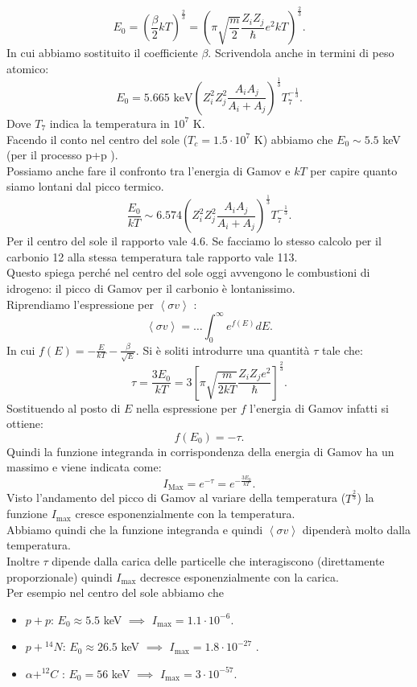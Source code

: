 \[
    E_0 = \left(\frac{\beta}{2}kT\right)^{\frac{2}{3}}=
    \left(\pi\sqrt{\frac{m}{2}} \frac{Z_iZ_j}{\hbar }e^2kT\right)^{\frac{2}{3}}
.\] 
In cui abbiamo sostituito il coefficiente $\beta$. Scrivendola anche in termini di peso atomico:
\[
    E_0=5.665 \text{ keV}\left(Z_i^2Z_j^2 \frac{A_iA_j}{A_i+A_j} \right)^{\frac{1}{3}}T_7^{-\frac{1}{3}}
.\] 
Dove $T_7$ indica la temperatura in $10^7$ K. \\
Facendo il conto nel centro del sole ($T_c = 1.5 \cdot 10^{7}$ K) abbiamo che $E_0 \sim 5.5 $ keV (per il processo p+p ).\\
Possiamo anche fare il confronto tra l'energia di Gamov e $kT$ per capire quanto siamo lontani dal picco termico.
\[
    \frac{E_0}{kT} \sim 6.574 \left(Z_i^2Z_j^2 \frac{A_iA_j }{A_i+A_j}\right)^{\frac{1}{3}}T_7^{-\frac{1}{3}}
.\] 
Per il centro del sole il rapporto vale $4.6$. Se facciamo lo stesso calcolo per il carbonio 12 alla stessa temperatura tale rapporto vale 113. \\
Questo spiega perché nel centro del sole oggi avvengono le combustioni di idrogeno: il picco di Gamov per il carbonio è lontanissimo. \\
Riprendiamo l'espressione per $\left<\sigma v\right>$  :
\[
    \left<\sigma v\right> = \ldots \int_{0}^{\infty} e^{f(E)}dE 
.\] 
In cui $f(E) = -\frac{E}{kT}-\frac{\beta}{\sqrt{E}}$. Si è soliti introdurre una quantità $\tau$  tale che:
\[
\tau = \frac{3E_0}{kT}= 3\left[\pi\sqrt{\frac{m}{2kT}} \frac{Z_iZ_je^2}{\hbar }\right]^{\frac{2}{3}}
.\] 
Sostituendo al posto di $E$ nella espressione per $f$ l'energia di Gamov infatti si ottiene:
\[
    f(E_0) = -\tau
.\] 
Quindi la funzione integranda in corrispondenza della energia di Gamov ha un massimo e viene indicata come:
\[
I_\text{Max} = e^{-\tau}=e^{-\frac{3E_0}{kT}}
.\] 
Visto l'andamento del picco di Gamov al variare della temperatura ($T^{\frac{2}{3}}$) la funzione $I_\text{max} $ cresce esponenzialmente con la temperatura.\\
Abbiamo quindi che la funzione integranda e quindi $\left<\sigma v\right>$  dipenderà molto dalla temperatura.\\
Inoltre $\tau$ dipende dalla carica delle particelle che interagiscono (direttamente proporzionale) quindi $I_\text{max} $ decresce esponenzialmente con la carica. \\
Per esempio nel centro del sole abbiamo che 
\begin{itemize}
    \item $p+p$: $E_0\approx 5.5$ keV $\implies$ $I_\text{max} = 1.1 \cdot 10^{-6}$.
    \item $p+{}^{14}N$: $E_0 \approx 26.5$ keV $\implies$ $I_\text{max} = 1.8 \cdot 10^{-27}$  .
    \item $\alpha +^{12}C$ : $E_0 = 56$ keV $\implies$ $I_\text{max} = 3\cdot 10^{-57}$.
\end{itemize}
